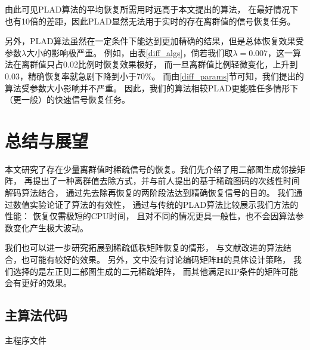 \documentclass[AutoFakeBold]{LZUThesis}
\begin{document}
由此可见PLAD算法的平均恢复所需用时远高于本文提出的算法，
在最好情况下也有10倍的差距，因此PLAD显然无法用于实时的存在离群值的信号恢复任务。

另外，PLAD算法虽然在一定条件下能达到更加精确的结果，但是总体恢复效果受参数$\lambda$大小的影响极严重。
例如，由表\ref{diff_algs}，倘若我们取$\lambda=0.007$，这一算法在离群值只占0.02比例时恢复效果极好，
而一旦离群值比例轻微变化，上升到0.03，精确恢复率就急剧下降到小于70\%。
而由\ref{diff_params}节可知，我们提出的算法受参数大小影响并不严重。
因此，我们的算法相较PLAD更能胜任多情形下（更一般）的快速信号恢复任务。

\chapter{总结与展望}

本文研究了存在少量离群值时稀疏信号的恢复。我们先介绍了用二部图生成邻接矩阵，
再提出了一种离群值去除方式，并与前人提出的基于稀疏图码的次线性时间解码算法结合，
通过先去除再恢复的两阶段法达到精确恢复信号的目的。
我们通过数值实验论证了算法的有效性，
通过与传统的PLAD算法比较展示我们方法的性能：
恢复仅需极短的CPU时间，
且对不同的情况更具一般性，也不会因算法参数变化产生极大波动。

我们也可以进一步研究拓展到稀疏低秩矩阵恢复的情形，
与文献\cite{10120641}改进的算法结合，也可能有较好的效果。
另外，文中没有讨论编码矩阵$\mathbf{H}$的具体设计策略，
我们选择的是左正则二部图生成的二元稀疏矩阵，
而其他满足RIP条件的矩阵可能会有更好的效果。


% 


\backmatter


\printbib



\Appendix

\section{主算法代码}

主程序文件
\end{document}
